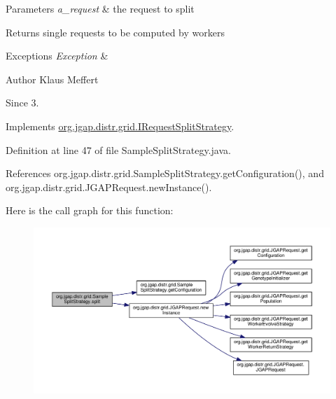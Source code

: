 \begin{DoxyParams}{Parameters}
{\em a\-\_\-request} & the request to split \\
\hline
\end{DoxyParams}
\begin{DoxyReturn}{Returns}
single requests to be computed by workers 
\end{DoxyReturn}

\begin{DoxyExceptions}{Exceptions}
{\em Exception} & \\
\hline
\end{DoxyExceptions}
\begin{DoxyAuthor}{Author}
Klaus Meffert 
\end{DoxyAuthor}
\begin{DoxySince}{Since}
3. 
\end{DoxySince}


Implements \hyperlink{interfaceorg_1_1jgap_1_1distr_1_1grid_1_1_i_request_split_strategy_ae43619a42994ddfad41f8fc6513cf44c}{org.\-jgap.\-distr.\-grid.\-I\-Request\-Split\-Strategy}.



Definition at line 47 of file Sample\-Split\-Strategy.\-java.



References org.\-jgap.\-distr.\-grid.\-Sample\-Split\-Strategy.\-get\-Configuration(), and org.\-jgap.\-distr.\-grid.\-J\-G\-A\-P\-Request.\-new\-Instance().



Here is the call graph for this function\-:
\nopagebreak
\begin{figure}[H]
\begin{center}
\leavevmode
\includegraphics[width=350pt]{classorg_1_1jgap_1_1distr_1_1grid_1_1_sample_split_strategy_ac7d09ab06f415b984bfd93703755ebea_cgraph}
\end{center}
\end{figure}




